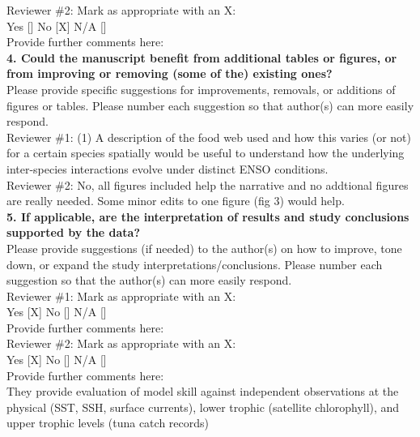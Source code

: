 \documentclass[12pt]{article}
\begin{document}
Reviewer \#2: Mark as appropriate with an X:\\
Yes [] No [X] N/A []\\
Provide further comments here:\\

\textbf{4. Could the manuscript benefit from additional tables or figures, or from improving or removing (some of the) existing ones?} \\

Please provide specific suggestions for improvements, removals, or additions of figures or tables. Please number each suggestion so that author(s) can more easily respond.\\

Reviewer \#1: (1) A description of the food web used and how this varies (or not) for a certain species spatially would be useful to understand how the underlying inter-species interactions evolve under distinct ENSO conditions.\\


Reviewer \#2: No, all figures included help the narrative and no addtional figures are really needed. Some minor edits to one figure (fig 3) would help.\\

\textbf{5. If applicable, are the interpretation of results and study conclusions supported by the data?}\\

Please provide suggestions (if needed) to the author(s) on how to improve, tone down, or expand the study interpretations/conclusions. Please number each suggestion so that the author(s) can more easily respond.\\

Reviewer \#1: Mark as appropriate with an X:\\
Yes [X] No [] N/A []\\
Provide further comments here:\\

Reviewer \#2: Mark as appropriate with an X:\\
Yes [X] No [] N/A []\\

Provide further comments here:\\ 

They provide evaluation of model skill against independent observations at the physical (SST, SSH, surface currents), lower trophic (satellite chlorophyll), and upper trophic levels (tuna catch records) \\
\end{document}
